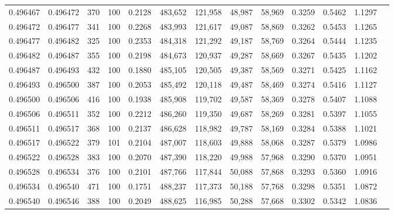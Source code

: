 \begin{tabular}{rrrrrrrrrrrrr}
0.496467 & 0.496472 &   370 & 100 &                                     0.2128 & 483,652 & 121,958 &  48,987 &  58,969 & 0.3259 & 0.5462 & 1.1297 \\
0.496472 & 0.496477 &   341 & 100 &                                     0.2268 & 483,993 & 121,617 &  49,087 &  58,869 & 0.3262 & 0.5453 & 1.1265 \\
0.496477 & 0.496482 &   325 & 100 &                                     0.2353 & 484,318 & 121,292 &  49,187 &  58,769 & 0.3264 & 0.5444 & 1.1235 \\
0.496482 & 0.496487 &   355 & 100 &                                     0.2198 & 484,673 & 120,937 &  49,287 &  58,669 & 0.3267 & 0.5435 & 1.1202 \\
0.496487 & 0.496493 &   432 & 100 &                                     0.1880 & 485,105 & 120,505 &  49,387 &  58,569 & 0.3271 & 0.5425 & 1.1162 \\
0.496493 & 0.496500 &   387 & 100 &                                     0.2053 & 485,492 & 120,118 &  49,487 &  58,469 & 0.3274 & 0.5416 & 1.1127 \\
0.496500 & 0.496506 &   416 & 100 &                                     0.1938 & 485,908 & 119,702 &  49,587 &  58,369 & 0.3278 & 0.5407 & 1.1088 \\
0.496506 & 0.496511 &   352 & 100 &                                     0.2212 & 486,260 & 119,350 &  49,687 &  58,269 & 0.3281 & 0.5397 & 1.1055 \\
0.496511 & 0.496517 &   368 & 100 &                                     0.2137 & 486,628 & 118,982 &  49,787 &  58,169 & 0.3284 & 0.5388 & 1.1021 \\
0.496517 & 0.496522 &   379 & 101 &                                     0.2104 & 487,007 & 118,603 &  49,888 &  58,068 & 0.3287 & 0.5379 & 1.0986 \\
0.496522 & 0.496528 &   383 & 100 &                                     0.2070 & 487,390 & 118,220 &  49,988 &  57,968 & 0.3290 & 0.5370 & 1.0951 \\
0.496528 & 0.496534 &   376 & 100 &                                     0.2101 & 487,766 & 117,844 &  50,088 &  57,868 & 0.3293 & 0.5360 & 1.0916 \\
0.496534 & 0.496540 &   471 & 100 &                                     0.1751 & 488,237 & 117,373 &  50,188 &  57,768 & 0.3298 & 0.5351 & 1.0872 \\
0.496540 & 0.496546 &   388 & 100 &                                     0.2049 & 488,625 & 116,985 &  50,288 &  57,668 & 0.3302 & 0.5342 & 1.0836 \\

\end{tabular}
